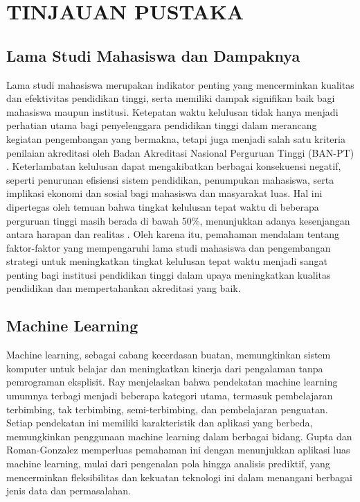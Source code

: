 \chapter{TINJAUAN PUSTAKA}

\section{Lama Studi Mahasiswa dan Dampaknya}
Lama studi mahasiswa merupakan indikator penting yang mencerminkan kualitas dan efektivitas pendidikan tinggi, serta memiliki dampak signifikan baik bagi mahasiswa maupun institusi. Ketepatan waktu kelulusan tidak hanya menjadi perhatian utama bagi penyelenggara pendidikan tinggi dalam merancang kegiatan pengembangan yang bermakna, tetapi juga menjadi salah satu kriteria penilaian akreditasi oleh Badan Akreditasi Nasional Perguruan Tinggi (BAN-PT) \cite{wirawan2019application}. Keterlambatan kelulusan dapat mengakibatkan berbagai konsekuensi negatif, seperti penurunan efisiensi sistem pendidikan, penumpukan mahasiswa, serta implikasi ekonomi dan sosial bagi mahasiswa dan masyarakat luas. Hal ini dipertegas oleh temuan bahwa tingkat kelulusan tepat waktu di beberapa perguruan tinggi masih berada di bawah 50\%, menunjukkan adanya kesenjangan antara harapan dan realitas \cite{dengen2018student}. Oleh karena itu, pemahaman mendalam tentang faktor-faktor yang mempengaruhi lama studi mahasiswa dan pengembangan strategi untuk meningkatkan tingkat kelulusan tepat waktu menjadi sangat penting bagi institusi pendidikan tinggi dalam upaya meningkatkan kualitas pendidikan dan mempertahankan akreditasi yang baik.

\section{Machine Learning}
Machine learning, sebagai cabang kecerdasan buatan, memungkinkan sistem komputer untuk belajar dan meningkatkan kinerja dari pengalaman tanpa pemrograman eksplisit. Ray \cite{ray2019quick} menjelaskan bahwa pendekatan machine learning umumnya terbagi menjadi beberapa kategori utama, termasuk pembelajaran terbimbing, tak terbimbing, semi-terbimbing, dan pembelajaran penguatan. Setiap pendekatan ini memiliki karakteristik dan aplikasi yang berbeda, memungkinkan penggunaan machine learning dalam berbagai bidang. Gupta dan Roman-Gonzalez \cite{gupta2020survey} memperluas pemahaman ini dengan menunjukkan aplikasi luas machine learning, mulai dari pengenalan pola hingga analisis prediktif, yang mencerminkan fleksibilitas dan kekuatan teknologi ini dalam menangani berbagai jenis data dan permasalahan.

